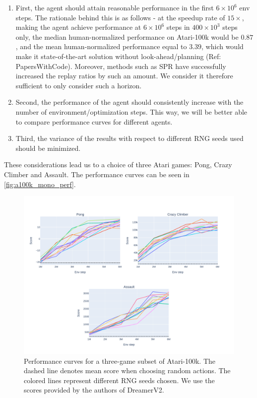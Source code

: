 \documentclass[twoside,11pt]{article}
\begin{document}
\begin{enumerate}
  \item First, the agent should attain reasonable performance in the first $6 \times 10^6$ env steps. The rationale behind this is as follows - at the speedup rate of $15\times$, making the agent achieve performance at $6 \times 10^6$ steps in $400 \times 10^3$ steps only, the median human-normalized performance on Atari-100k would be $0.87$, and the mean human-normalized performance equal to $3.39$, which would make it state-of-the-art solution without look-ahead/planning (Ref: PapersWithCode). Moreover, methods such as SPR have successfully increased the replay ratios by such an amount. We consider it therefore sufficient to only consider such a horizon.
  \item Second, the performance of the agent should consistently increase with the number of environment/optimization steps. This way, we will be better able to compare performance curves for different agents.
  \item Third, the variance of the results with respect to different RNG seeds used should be minimized.
\end{enumerate}

These considerations lead us to a choice of three Atari games: Pong, Crazy Climber and Assault. The performance curves can be seen in \autoref{fig:a100k_mono_perf}.

\begin{figure}
  \includegraphics[width=\linewidth]{assets/perf_curves.pdf}
  \caption{Performance curves for a three-game subset of Atari-100k. The dashed line denotes mean score when choosing random actions. The colored lines represent different RNG seeds chosen. We use the scores provided by the authors of DreamerV2.}
  \label{fig:a100k_mono_perf}
\end{figure}
\end{document}

